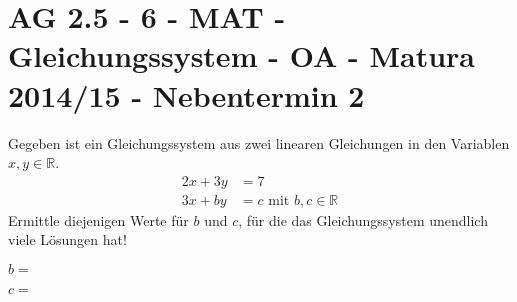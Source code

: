 \section{AG 2.5 - 6 - MAT - Gleichungssystem - OA - Matura 2014/15 - Nebentermin 2}

\begin{beispiel}[AG 2.5]{1} %
				Gegeben ist ein Gleichungssystem aus zwei linearen Gleichungen in den Variablen $x,y\in\mathbb{R}$.
			\begin{align*} 2x+3y &= 7\\ 3x+by &= c\text{ mit }b,c\in\mathbb{R} \end{align*}
			Ermittle diejenigen Werte für $b$ und $c$, für die das Gleichungssystem unendlich viele Lösungen hat!
			\leer
			
			$b=$ 
			\leer
			
			$c=$ 
\end{beispiel}